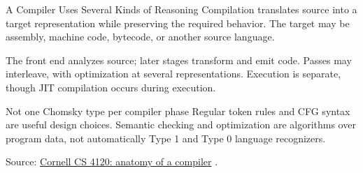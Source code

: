 \documentclass[10pt]{beamer}
\newcommand{\paperlink}[2]{%
  \href{#1}{\textcolor{blue!65!black}{#2}}%
}
\begin{document}
\begin{frame}{A Compiler Uses Several Kinds of Reasoning}
  \small
  Compilation translates source into a target representation while
  preserving the required behavior. The target may be assembly, machine
  code, bytecode, or another source language.
  \begin{center}
  \end{center}
  \pause
  The front end analyzes source; later stages transform and emit code.
  Passes may interleave, with optimization at several representations.
  Execution is separate, though JIT compilation occurs during execution.
  \begin{alertblock}{Not one Chomsky type per compiler phase}
    Regular token rules and CFG syntax are useful design choices.
    Semantic checking and optimization are algorithms over program data,
    not automatically Type 1 and Type 0 language recognizers.
  \end{alertblock}
  {\scriptsize Source: \paperlink{https://www.cs.cornell.edu/courses/cs4120/2023sp/notes/intro/}
  {Cornell CS 4120: anatomy of a compiler}.}
\end{frame}
\end{document}
